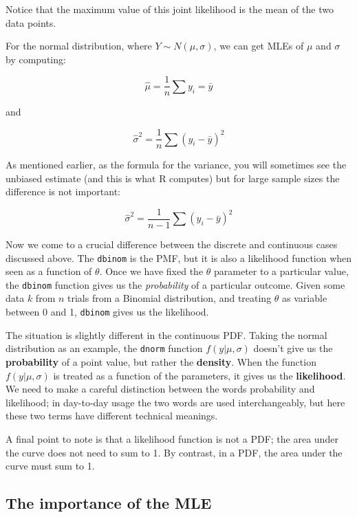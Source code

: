 \documentclass[
  12pt,
]{krantz}
\theoremstyle{definition}
\theoremstyle{definition}
\theoremstyle{definition}
\theoremstyle{definition}
\theoremstyle{remark}
\begin{document}
Notice that the maximum value of this joint likelihood is the mean of the two data points.

For the normal distribution, where \(Y \sim N(\mu,\sigma)\), we can get MLEs of \(\mu\) and \(\sigma\) by computing:

\begin{equation}
  \hat \mu = \frac{1}{n}\sum y_i = \bar{y}  
\end{equation}

and

\begin{equation}
    \hat \sigma ^2 = \frac{1}{n}\sum (y_i-\bar{y})^2
\end{equation}

As mentioned earlier, as the formula for the variance, you will sometimes see the unbiased estimate (and this is what R computes) but for large sample sizes the difference is not important:

\begin{equation}
  \hat \sigma ^2 = \frac{1}{n-1}\sum (y_i-\bar{y})^2
\end{equation}

Now we come to a crucial difference between the discrete and continuous cases discussed above. The \texttt{dbinom} is the PMF, but it is also a likelihood function when seen as a function of \(\theta\). Once we have fixed the \(\theta\) parameter to a particular value, the \texttt{dbinom} function gives us the \emph{probability} of a particular outcome.
Given some data \(k\) from \(n\) trials from a Binomial distribution, and treating \(\theta\) as variable between 0 and 1, \texttt{dbinom} gives us the likelihood.

The situation is slightly different in the continuous PDF. Taking the normal distribution as an example, the \texttt{dnorm} function \(f(y|\mu,\sigma)\) doesn't give us the \textbf{probability} of a point value, but rather the \textbf{density}. When the function \(f(y|\mu,\sigma)\) is treated as a function of the parameters, it gives us the \textbf{likelihood}. We need to make a careful distinction between the words probability and likelihood; in day-to-day usage the two words are used interchangeably, but here these two terms have different technical meanings.

A final point to note is that a likelihood function is not a PDF; the area under the curve does not need to sum to 1. By contrast, in a PDF, the area under the curve must sum to 1.

\hypertarget{the-importance-of-the-mle}{%
\subsection{The importance of the MLE}\label{the-importance-of-the-mle}}
\end{document}
